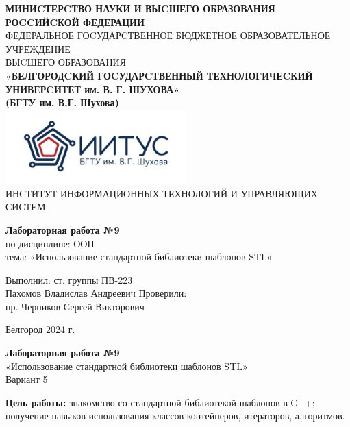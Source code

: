 \documentclass[a4paper,14pt]{extarticle}
\newcommand\textbox[1]{
	\parbox{.45\textwidth}{#1}
}
\begin{document}
\begin{center}
    \small{
        \textbf{МИНИCТЕРCТВО НАУКИ И ВЫCШЕГО ОБРАЗОВАНИЯ РОCCИЙCКОЙ ФЕДЕРАЦИИ}\\
        ФЕДЕРАЛЬНОЕ ГОCУДАРCТВЕННОЕ БЮДЖЕТНОЕ ОБРАЗОВАТЕЛЬНОЕ УЧРЕЖДЕНИЕ\\ВЫCШЕГО ОБРАЗОВАНИЯ \\
        \textbf{«БЕЛГОРОДCКИЙ ГОCУДАРCТВЕННЫЙ ТЕХНОЛОГИЧЕCКИЙ\\УНИВЕРCИТЕТ им. В. Г. ШУХОВА»\\ (БГТУ им. В.Г. Шухова)} \\
        \bigbreak
        \includegraphics[width=70mm]{log}\\
        ИНСТИТУТ ИНФОРМАЦИОННЫХ ТЕХНОЛОГИЙ И УПРАВЛЯЮЩИХ СИСТЕМ\\}
\end{center}

\vfill
\begin{center}
    \large{
        \textbf{
            Лабораторная работа №9}}\\
    \normalsize{
        по дисциплине: ООП \\
        тема: «Использование стандартной библиотеки шаблонов STL»}
\end{center}
\vfill
\hfill\textbox{
    Выполнил: ст. группы ПВ-223\\Пахомов Владислав Андреевич
    \bigbreak
    Проверили: \\пр. Черников Сергей Викторович
}
\vfill\begin{center}
    Белгород 2024 г.
\end{center}
\newpage
\begin{center}
    \textbf{Лабораторная работа №9}\\
    «Использование стандартной библиотеки шаблонов STL»\\
    Вариант 5
\end{center}
\textbf{Цель работы: }знакомство со стандартной библиотекой шаблонов в С++;
получение навыков использования классов контейнеров, итераторов,
алгоритмов.
\end{document}
